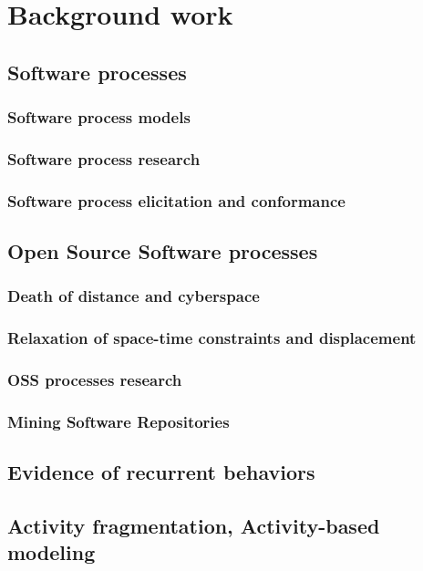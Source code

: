 \chapter{Background work}

\section{Software processes}
\subsection{Software process models}
\subsection{Software process research}
\subsection{Software process elicitation and conformance}

\section{Open Source Software processes}
\subsection{Death of distance and cyberspace}
\subsection{Relaxation of space-time constraints and displacement}
\subsection{OSS processes research}
\subsection{Mining Software Repositories}

\section{Evidence of recurrent behaviors}

\section{Activity fragmentation, Activity-based modeling}

